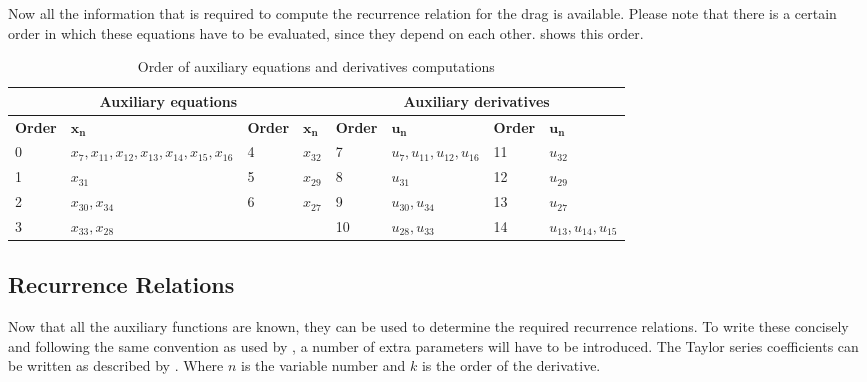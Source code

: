 \noindent
Now all the information that is required to compute the recurrence relation for the drag is available. Please note that there is a certain order in which these equations have to be evaluated, since they depend on each other.  shows this order.


\begin{table}[H]
\begin{center}
\caption{Order of auxiliary equations and derivatives computations}
\label{tab:calcOrderAuxEq}
\begin{tabular}{|l|l||l|l||l|l||l|l|}
\hline 
\multicolumn{4}{|c||}{\textbf{Auxiliary equations}} & \multicolumn{4}{c|}{\textbf{Auxiliary derivatives}} \\ \hline \hline
\textbf{Order} & $\mathbf{x_{n}}$ &\textbf{Order} & $\mathbf{x_{n}}$ & \textbf{Order} & $\mathbf{u_{n}}$ & \textbf{Order} & $\mathbf{u_{n}}$ \\ \hline 
0 & $ x_{7} ,x_{11}, x_{12}, x_{13}, x_{14}, x_{15}, x_{16} $ & 4 & $ x_{32}$ & 7 & $ u_{7}, u_{11}, u_{12}, u_{16} $ & 11 & $ u_{32} $  \\ \hline
1 & $ x_{31} $ & 5 & $ x_{29} $  & 8 & $u_{31}$ &  12 &  $ u_{29} $ \\ \hline
2 & $ x_{30}, x_{34}$ & 6 & $ x_{27} $  & 9 & $ u_{30}, u_{34} $ &  13 & $ u_{27} $ \\ \hline
3 & $ x_{33}, x_{28} $ &   &  & 10 & $ u_{28}, u_{33} $ &  14 &  $ u_{13}, u_{14}, u_{15} $\\ \hline


\end{tabular}
\end{center}
\end{table}





%
%



\subsection{Recurrence Relations}
\label{subsec:recRel}
Now that all the auxiliary functions are known, they can be used to determine the required recurrence relations. To write these concisely and following the same convention as used by \cite{scott2008high}, a number of extra parameters will have to be introduced. The Taylor series coefficients can be written as described by . Where $n$ is the variable number and $k$ is the order of the derivative.

